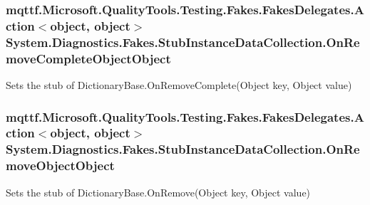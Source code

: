 \hypertarget{class_system_1_1_diagnostics_1_1_fakes_1_1_stub_instance_data_collection_a81db9cfd9f96894fb3e51f3581275031}{
\subsubsection[{On\-Remove\-Complete\-Object\-Object}]{\setlength{\rightskip}{0pt plus 5cm}mqttf.\-Microsoft.\-Quality\-Tools.\-Testing.\-Fakes.\-Fakes\-Delegates.\-Action$<$object, object$>$ System.\-Diagnostics.\-Fakes.\-Stub\-Instance\-Data\-Collection.\-On\-Remove\-Complete\-Object\-Object}}\label{class_system_1_1_diagnostics_1_1_fakes_1_1_stub_instance_data_collection_a81db9cfd9f96894fb3e51f3581275031}


Sets the stub of Dictionary\-Base.\-On\-Remove\-Complete(\-Object key, Object value)

\hypertarget{class_system_1_1_diagnostics_1_1_fakes_1_1_stub_instance_data_collection_adbccd3753402d137819c7e1769aa7c19}{
\subsubsection[{On\-Remove\-Object\-Object}]{\setlength{\rightskip}{0pt plus 5cm}mqttf.\-Microsoft.\-Quality\-Tools.\-Testing.\-Fakes.\-Fakes\-Delegates.\-Action$<$object, object$>$ System.\-Diagnostics.\-Fakes.\-Stub\-Instance\-Data\-Collection.\-On\-Remove\-Object\-Object}}\label{class_system_1_1_diagnostics_1_1_fakes_1_1_stub_instance_data_collection_adbccd3753402d137819c7e1769aa7c19}


Sets the stub of Dictionary\-Base.\-On\-Remove(\-Object key, Object value)

